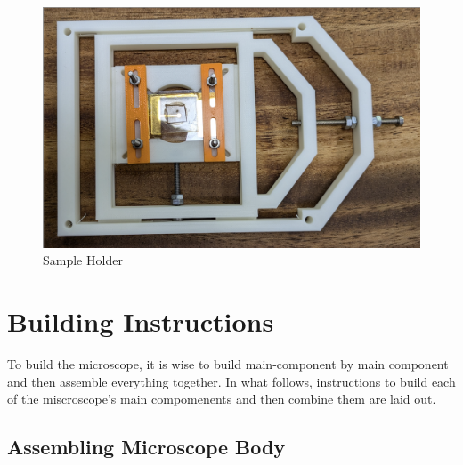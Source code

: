 \documentclass[runningheads]{llncs}
\begin{document}
\begin{figure}[h]
\begin{minipage}[b]{0.5\textwidth}
        \label{fig:OlympusStage}
    \end{minipage}
    \hfill
        \begin{minipage}[b]{0.43\textwidth}
        \centering
        \includegraphics[width=\textwidth]{images/sample_holder.png} 
        \caption{Sample Holder}
        \label{fig:SampleHolder}
    \end{minipage}
\end{figure}





\section*{Building Instructions}

To build the microscope, it is wise to build main-component by main component and then assemble everything together. In what follows, instructions to build each of the miscroscope's main compomenents and then combine them are laid out. 

\subsection*{Assembling Microscope Body}
\end{document}
